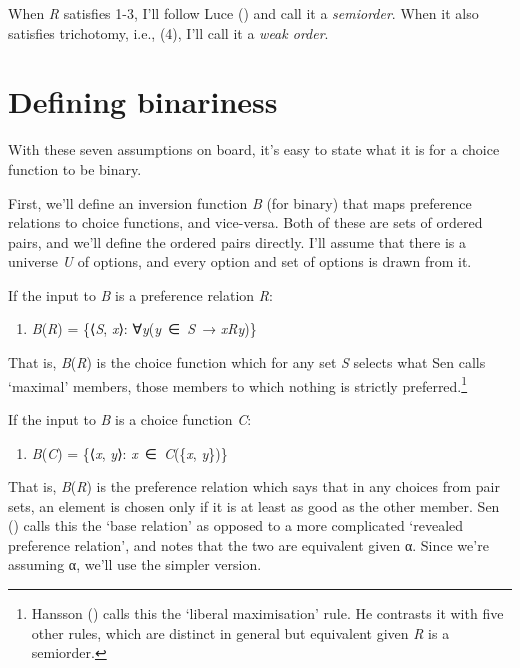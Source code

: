 \documentclass[
  11pt,
  letterpaper,
  DIV=11,
  numbers=noendperiod,
  twoside]{scrartcl}
\providecommand{\tightlist}{%
  \setlength{\itemsep}{0pt}\setlength{\parskip}{0pt}}
\begin{document}
When \emph{R} satisfies 1-3, I'll follow Luce
() and call it a \emph{semiorder}. When it
also satisfies trichotomy, i.e., (4), I'll call it a \emph{weak order}.

\section{Defining binariness}\label{sec-defining}

With these seven assumptions on board, it's easy to state what it is for
a choice function to be binary.

First, we'll define an inversion function \emph{B} (for binary) that
maps preference relations to choice functions, and vice-versa. Both of
these are sets of ordered pairs, and we'll define the ordered pairs
directly. I'll assume that there is a universe \emph{U} of options, and
every option and set of options is drawn from it.

If the input to \emph{B} is a preference relation \emph{R}:

\begin{enumerate}
\def\labelenumi{(\arabic{enumi})}
\setcounter{enumi}{6}
\tightlist
\item
  \emph{B}(\emph{R}) = \{⟨\emph{S}, \emph{x}⟩:
  ∀\emph{y}(\emph{y}~∈~\emph{S}~→ \emph{xRy})\}
\end{enumerate}

That is, \emph{B}(\emph{R}) is the choice function which for any set
\emph{S} selects what Sen calls `maximal' members, those members to
which nothing is strictly preferred.\footnote{Hansson
  () calls this the `liberal
  maximisation' rule. He contrasts it with five other rules, which are
  distinct in general but equivalent given \emph{R} is a semiorder.}

If the input to \emph{B} is a choice function \emph{C}:

\begin{enumerate}
\def\labelenumi{(\arabic{enumi})}
\setcounter{enumi}{7}
\tightlist
\item
  \emph{B}(\emph{C}) = \{⟨\emph{x}, \emph{y}⟩:
  \emph{x}~∈~\emph{C}(\{\emph{x}, \emph{y}\})\}
\end{enumerate}

That is, \emph{B}(\emph{R}) is the preference relation which says that
in any choices from pair sets, an element is chosen only if it is at
least as good as the other member. Sen
() calls this the `base
relation' as opposed to a more complicated `revealed preference
relation', and notes that the two are equivalent given α. Since we're
assuming α, we'll use the simpler version.
\end{document}
